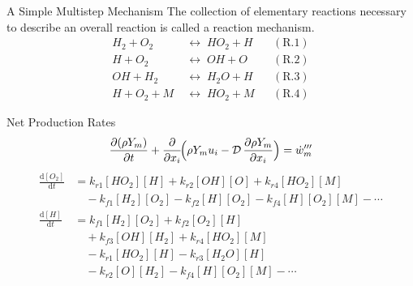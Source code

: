 \documentclass[10pt,aspectratio=43]{beamer}
\newcommand{\dd}{\mathrm{d}}
\newcommand{\pd}[2]{\frac{\partial #1}{\partial #2}}
\begin{document}
\begin{frame}{A Simple Multistep Mechanism}
  The collection of elementary reactions necessary to describe an overall
  reaction is called a \alert{reaction mechanism}.
  \begin{align*}
    H_{2} + O_{2} &\;\longleftrightarrow\; HO_{2} + H && (\text{R.1}) \\
    H + O_{2} &\;\longleftrightarrow\; OH + O && (\text{R.2}) \\
    OH + H_{2} &\;\longleftrightarrow\; H_{2}O + H && (\text{R.3}) \\
    H + O_{2} + M &\;\longleftrightarrow\; HO_{2} + M && (\text{R.4})
  \end{align*}
\end{frame}

\begin{frame}{Net Production Rates}
  \[
    \pd{(\rho Y_{m})}{t} + \pd{}{x_{i}}\!\Bigl(\rho Y_{m}u_{i} - \mathcal{D}\,\pd{\rho Y_{m}}{x_{i}}\Bigr) = \dot{w}'''_{m}
  \]
  \footnotesize
  \begin{align*}
    \frac{\dd[O_{2}]}{\dd t} &= k_{r1}[HO_{2}][H] + k_{r2}[OH][O] + k_{r4}[HO_{2}][M] \\
                              &\quad - k_{f1}[H_{2}][O_{2}] - k_{f2}[H][O_{2}] - k_{f4}[H][O_{2}][M] - \cdots \\[4pt]
    \frac{\dd[H]}{\dd t}     &= k_{f1}[H_{2}][O_{2}] + k_{f2}[O_{2}][H] \\
                              &\quad + k_{f3}[OH][H_{2}] + k_{r4}[HO_{2}][M] \\
                              &\quad - k_{r1}[HO_{2}][H] - k_{r3}[H_{2}O][H] \\
                              &\quad - k_{r2}[O][H_{2}] - k_{f4}[H][O_{2}][M] - \cdots
  \end{align*}
\end{frame}
\end{document}
